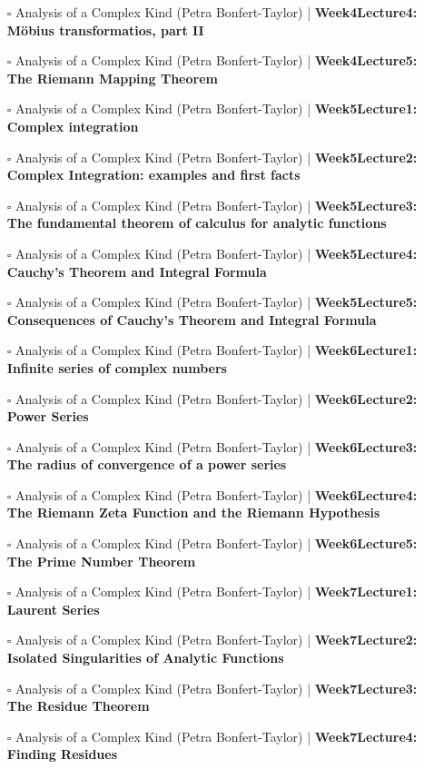 \documentclass[a4, landscape, 12pt]{article}
\newcommand{\checkbox}{$\square$}%
\begin{document}
\begin{itemize}
{}
\item [\checkbox] Analysis of a Complex Kind (Petra Bonfert-Taylor)  | \textbf{Week4Lecture4: Möbius transformatios, part II
}
\item [\checkbox] Analysis of a Complex Kind (Petra Bonfert-Taylor)  | \textbf{Week4Lecture5: The Riemann Mapping Theorem
}
\item [\checkbox] Analysis of a Complex Kind (Petra Bonfert-Taylor)  | \textbf{Week5Lecture1: Complex integration
}
\item [\checkbox] Analysis of a Complex Kind (Petra Bonfert-Taylor)  | \textbf{Week5Lecture2: Complex Integration: examples and first facts
}
\item [\checkbox] Analysis of a Complex Kind (Petra Bonfert-Taylor)  | \textbf{Week5Lecture3: The fundamental theorem of calculus for analytic functions
}
\item [\checkbox] Analysis of a Complex Kind (Petra Bonfert-Taylor)  | \textbf{Week5Lecture4: Cauchy's Theorem and Integral Formula
}
\item [\checkbox] Analysis of a Complex Kind (Petra Bonfert-Taylor)  | \textbf{Week5Lecture5: Consequences of Cauchy's Theorem and Integral Formula
}
\item [\checkbox] Analysis of a Complex Kind (Petra Bonfert-Taylor)  | \textbf{Week6Lecture1: Infinite series of complex numbers
}
\item [\checkbox] Analysis of a Complex Kind (Petra Bonfert-Taylor)  | \textbf{Week6Lecture2: Power Series
}
\item [\checkbox] Analysis of a Complex Kind (Petra Bonfert-Taylor)  | \textbf{Week6Lecture3: The radius of convergence of a power series
}
\item [\checkbox] Analysis of a Complex Kind (Petra Bonfert-Taylor)  | \textbf{Week6Lecture4: The Riemann Zeta Function and the Riemann Hypothesis
}
\item [\checkbox] Analysis of a Complex Kind (Petra Bonfert-Taylor)  | \textbf{Week6Lecture5: The Prime Number Theorem
}
\item [\checkbox] Analysis of a Complex Kind (Petra Bonfert-Taylor)  | \textbf{Week7Lecture1: Laurent Series
}
\item [\checkbox] Analysis of a Complex Kind (Petra Bonfert-Taylor)  | \textbf{Week7Lecture2: Isolated Singularities of 
Analytic Functions
}
\item [\checkbox] Analysis of a Complex Kind (Petra Bonfert-Taylor)  | \textbf{Week7Lecture3: The Residue Theorem
}
\item [\checkbox] Analysis of a Complex Kind (Petra Bonfert-Taylor)  | \textbf{Week7Lecture4: Finding Residues
}
\end{itemize}
\end{document}
